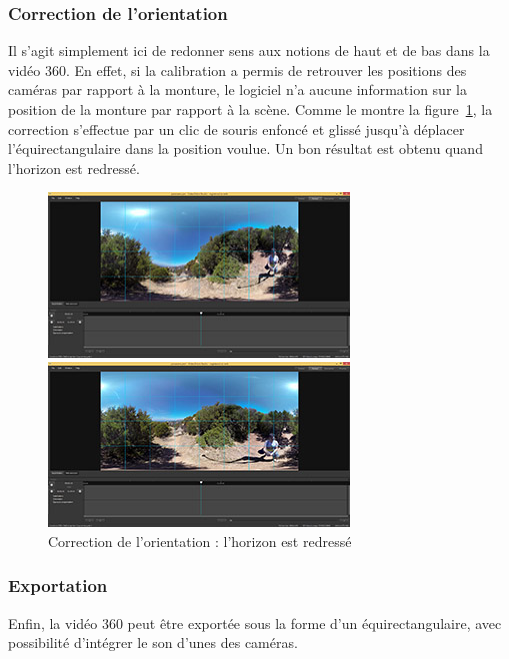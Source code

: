 \subsubsection{Correction de l'orientation}
Il s'agit simplement ici de redonner sens aux notions de haut et de bas dans la 
vidéo 360. En effet, si la calibration a permis de retrouver les positions des 
caméras par rapport à la monture, le logiciel n'a aucune information sur la position
de la monture par rapport à la scène. Comme le montre la figure~\ref{orientation},
la correction s'effectue par un clic de souris enfoncé
et glissé jusqu'à déplacer l'équirectangulaire dans la position voulue. Un bon résultat
est obtenu quand l'horizon est redressé.
\begin{figure}
  \centering
  \begin{minipage}{0.45\textwidth}
    \centering
    \includegraphics[width=8.0cm]{images/studio-output-exposure-grid.jpg}
  \end{minipage}%
  \hspace{0.08\textwidth}
  \begin{minipage}{0.45\textwidth}
    \centering
    \includegraphics[width=8.0cm]{images/studio-output-exposure-grid-oriented.jpg}
  \end{minipage}
  \caption{Correction de l'orientation : l'horizon est redressé}
  \label{orientation}
\end{figure}

\subsubsection{Exportation}
Enfin, la vidéo 360 peut être exportée sous la forme d'un équirectangulaire, avec
possibilité d'intégrer le son d'unes des caméras.

